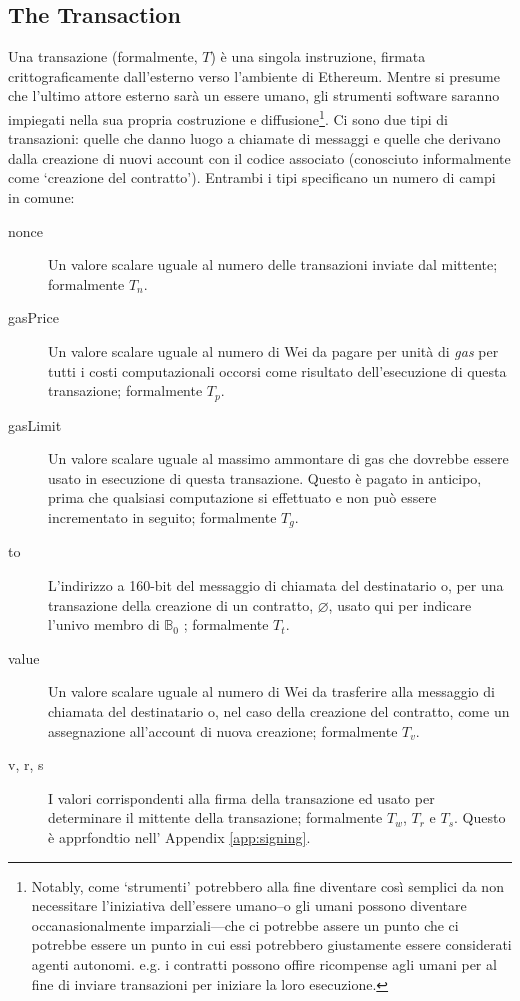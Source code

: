\documentclass[9pt,oneside]{amsart}
\makeatletter
\newcommand*\eg{e.g.\@\xspace}
\makeatother
\begin{document}
\begin{multicols}{2}
\subsection{The Transaction} \label{ch:transaction}

Una transazione (formalmente, $T$) è una singola instruzione, firmata crittograficamente dall'esterno verso l'ambiente di Ethereum. Mentre si presume che l'ultimo attore esterno sarà un essere umano, gli strumenti software saranno impiegati nella sua propria costruzione e diffusione\footnote{Notably, come `strumenti' potrebbero alla fine diventare così semplici da non necessitare l'iniziativa dell'essere umano--o gli umani possono diventare occanasionalmente imparziali---che ci potrebbe assere un punto che ci potrebbe essere un punto in cui essi potrebbero giustamente essere considerati agenti autonomi. \eg i contratti possono offire ricompense agli umani per al fine di inviare transazioni per iniziare la loro esecuzione.}. Ci sono due tipi di transazioni: quelle che danno luogo a chiamate di messaggi e quelle che derivano dalla creazione di nuovi account con il codice associato (conosciuto informalmente come `creazione del contratto'). Entrambi i tipi specificano un numero di campi in comune:

\begin{description}
\item[nonce] Un valore scalare uguale al numero delle transazioni inviate dal mittente; formalmente $T_n$.
\item[gasPrice] Un valore scalare uguale al numero di Wei da pagare per unità di \textit{gas} per tutti i costi computazionali occorsi come risultato dell'esecuzione di questa transazione; formalmente $T_p$.
\item[gasLimit] Un valore scalare uguale al massimo ammontare di gas che dovrebbe essere usato in esecuzione di questa transazione. Questo è pagato in anticipo, prima che qualsiasi computazione si effettuato e non può essere incrementato in seguito; formalmente $T_g$.
\item[to] L'indirizzo a 160-bit del messaggio di chiamata del destinatario o, per una transazione della creazione di un contratto, $\varnothing$, usato qui per indicare l'univo membro di $\mathbb{B}_0$ ; formalmente $T_t$.
\item[value] Un valore scalare uguale al numero di Wei da trasferire alla messaggio di chiamata del destinatario o, nel caso della creazione del contratto, come un assegnazione all'account di nuova creazione; formalmente $T_v$.
\item[v, r, s] I valori corrispondenti alla firma della transazione ed usato per determinare il mittente della transazione; formalmente $T_w$, $T_r$ e $T_s$. Questo è apprfondtio nell' Appendix \ref{app:signing}.
\end{description}


\end{multicols}
\end{document}
